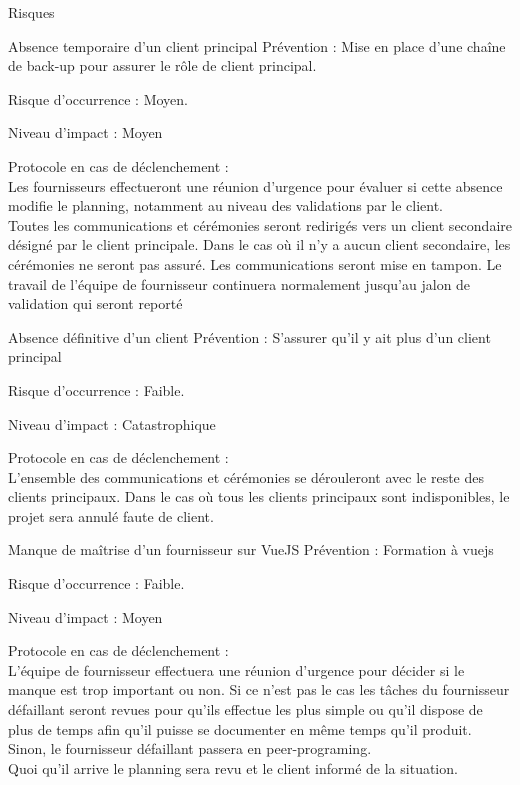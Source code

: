 \documentclass[]{article}
\begin{document}
\begin{section}{Risques}
        \begin{subsection}{Absence temporaire d’un client principal}
            Prévention : Mise en place d’une chaîne de back-up pour assurer le rôle de client principal.

            Risque d’occurrence : Moyen.

            Niveau d’impact : Moyen

            Protocole en cas de déclenchement :\\
            Les fournisseurs effectueront une réunion d’urgence pour évaluer si cette absence modifie le
            planning, notamment au niveau des validations par le client.\\
            Toutes les communications et cérémonies seront redirigés vers un client secondaire désigné par le
            client principale. Dans le cas où il n’y a aucun client secondaire, les cérémonies ne seront pas
            assuré. Les communications seront mise en tampon. Le travail de l’équipe de fournisseur continuera
            normalement jusqu’au jalon de validation qui seront reporté
        \end{subsection}

        \begin{subsection}{Absence définitive d’un client}
            Prévention : S’assurer qu’il y ait plus d’un client principal

            Risque d’occurrence : Faible.

            Niveau d’impact : Catastrophique

            Protocole en cas de déclenchement :\\
            L’ensemble des communications et cérémonies se dérouleront avec le reste des clients principaux.
            Dans le cas où tous les clients principaux sont indisponibles, le projet sera annulé faute de client.
            
        \end{subsection}

        \begin{subsection}{Manque de maîtrise d’un fournisseur sur VueJS}
            Prévention : Formation à vuejs

            Risque d’occurrence : Faible.

            Niveau d’impact : Moyen

            Protocole en cas de déclenchement :\\
            L’équipe de fournisseur effectuera une réunion d’urgence pour décider si le manque est trop
            important ou non. Si ce n’est pas le cas les tâches du fournisseur défaillant seront revues pour qu’ils
            effectue les plus simple ou qu’il dispose de plus de temps afin qu’il puisse se documenter en même
            temps qu’il produit. Sinon, le fournisseur défaillant passera en peer-programing.\\
            Quoi qu’il arrive le planning sera revu et le client informé de la situation.
        \end{subsection}


\end{section}
\end{document}
